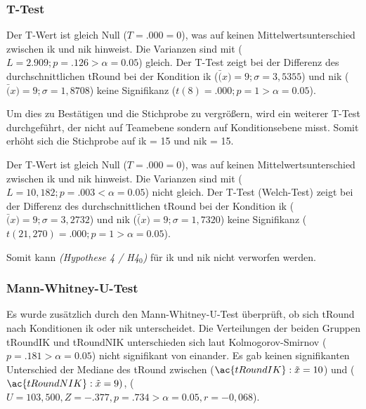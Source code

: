 \documentclass[a4paper,11pt]{article}%
\renewcommand{\\}{\vspace*{0.5\baselineskip} \newline}
\begin{document}
		\subsubsection{T-Test}
Der T-Wert ist gleich Null ($T = .000 = 0$), was auf keinen Mittelwertsunterschied zwischen \ac{ik} und \ac{nik} hinweist.
Die Varianzen sind mit ($L= 2.909; p = .126 > \alpha = 0.05$) gleich.
Der T-Test zeigt bei der Differenz des durchschnittlichen \ac{tRound} bei der Kondition \ac{ik} ($\bar(x) = 9; \sigma = 3,5355$) und \ac{nik} ($\bar(x) = 9; \sigma = 1,8708$) keine Signifikanz ($t(8) = .000; p = 1 > \alpha = 0.05$).\\


Um dies zu Bestätigen und die Stichprobe zu vergrößern, wird ein weiterer T-Test durchgeführt, der nicht auf Teamebene sondern auf Konditionsebene misst. Somit erhöht sich die Stichprobe auf \ac{ik} = 15 und \ac{nik} = 15.

Der T-Wert ist gleich Null ($T = .000 = 0$), was auf keinen Mittelwertsunterschied zwischen \ac{ik} und \ac{nik} hinweist.
Die Varianzen sind mit ($L= 10,182; p = .003 < \alpha = 0.05$) nicht gleich.
Der T-Test (Welch-Test) zeigt bei der Differenz des durchschnittlichen \ac{tRound} bei der Kondition \ac{ik} ($\bar(x) = 9; \sigma = 3,2732$) und \ac{nik} ($\bar(x) = 9; \sigma = 1,7320$) keine Signifikanz ($t(21,270) = .000; p = 1 > \alpha = 0.05$).\\

Somit kann \textit{(Hypothese 4 / H4$_{0}$)} für \ac{ik} und \ac{nik} nicht verworfen werden.

\subsubsection{Mann-Whitney-U-Test}
Es wurde zusätzlich durch den Mann-Whitney-U-Test überprüft, ob sich \ac{tRound} nach Konditionen \ac{ik} oder \ac{nik} unterscheidet. Die Verteilungen der beiden Gruppen \ac{tRoundIK} und \ac{tRoundNIK} unterschieden sich laut Kolmogorov-Smirnov ($p = .181 > \alpha = 0.05$) nicht signifikant von einander. Es gab keinen signifikanten Unterschied der Mediane des \ac{tRound} zwischen ($\ac{tRoundIK} : \tilde x = 10$) und ($\ac{tRoundNIK} : \tilde x = 9)$, ($U = 103,500, Z = -.377, p = .734 > \alpha = 0.05, r = -0,068$). \\
\end{document}
